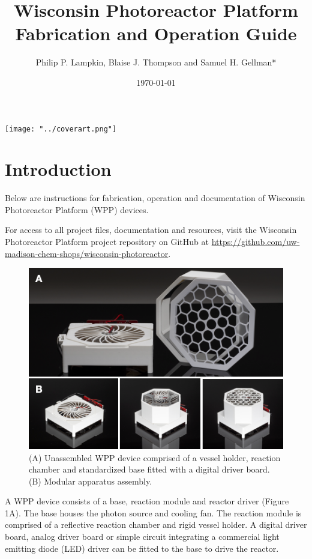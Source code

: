 \documentclass[11pt]{article}
\title{Wisconsin Photoreactor Platform\\Fabrication and Operation Guide}
\author{Philip P. Lampkin, Blaise J. Thompson and Samuel H. Gellman*}
\date{\today}
\let\stdsection\section
\renewcommand\section{\clearpage\stdsection}
\begin{document}
\maketitle

\texttt{[image: "../coverart.png"]}

\tableofcontents

\section{Introduction}

Below are instructions for fabrication, operation and documentation of Wisconsin Photoreactor Platform (WPP) devices.

For access to all project files, documentation and resources, visit the Wisconsin Photoreactor Platform project repository on GitHub at \href{https://github.com/uw-madison-chem-shops/wisconsin-photoreactor}{https://github.com/uw-madison-chem-shops/wisconsin-photoreactor}.

\begin{figure}[H]
	\includegraphics[width=\textwidth]{"./fig1.png"}
	\caption{(A) Unassembled WPP device comprised of a vessel holder, reaction chamber and standardized base fitted with a digital driver board. (B) Modular apparatus assembly.}
\end{figure}
A WPP device consists of a base, reaction module and reactor driver (Figure 1A).
The base houses the photon source and cooling fan.
The reaction module is comprised of a reflective reaction chamber and rigid vessel holder.
A digital driver board, analog driver board or simple circuit integrating a commercial light emitting diode (LED) driver can be fitted to the base to drive the reactor.
\end{document}
